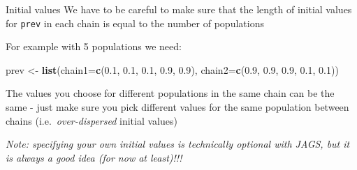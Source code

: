 \documentclass[
  ignorenonframetext,
]{beamer}
\newenvironment{Shaded}{\begin{snugshade}}{\end{snugshade}}
\newcommand{\AttributeTok}[1]{\textcolor[rgb]{0.13,0.29,0.53}{#1}}
\newcommand{\FloatTok}[1]{\textcolor[rgb]{0.00,0.00,0.81}{#1}}
\newcommand{\FunctionTok}[1]{\textcolor[rgb]{0.13,0.29,0.53}{\textbf{#1}}}
\newcommand{\NormalTok}[1]{#1}
\newcommand{\OtherTok}[1]{\textcolor[rgb]{0.56,0.35,0.01}{#1}}
\begin{document}
\begin{frame}[fragile]
\begin{block}{Initial values}
\protect\hypertarget{initial-values-1}{}
We have to be careful to make sure that the length of initial values for
\texttt{prev} in each chain is equal to the number of populations

For example with 5 populations we need:

\scriptsize

\begin{Shaded}
\begin{Highlighting}[]
\NormalTok{prev }\OtherTok{\textless{}{-}} \FunctionTok{list}\NormalTok{(}\AttributeTok{chain1=}\FunctionTok{c}\NormalTok{(}\FloatTok{0.1}\NormalTok{, }\FloatTok{0.1}\NormalTok{, }\FloatTok{0.1}\NormalTok{, }\FloatTok{0.9}\NormalTok{, }\FloatTok{0.9}\NormalTok{), }\AttributeTok{chain2=}\FunctionTok{c}\NormalTok{(}\FloatTok{0.9}\NormalTok{, }\FloatTok{0.9}\NormalTok{, }\FloatTok{0.9}\NormalTok{, }\FloatTok{0.1}\NormalTok{, }\FloatTok{0.1}\NormalTok{))}
\end{Highlighting}
\end{Shaded}

\normalsize

The values you choose for different populations in the same chain can be
the same - just make sure you pick different values for the same
population between chains (i.e.~\emph{over-dispersed} initial values)

\emph{Note: specifying your own initial values is technically optional
with JAGS, but it is always a good idea (for now at least)!!!}
\end{block}
\end{frame}
\end{document}
